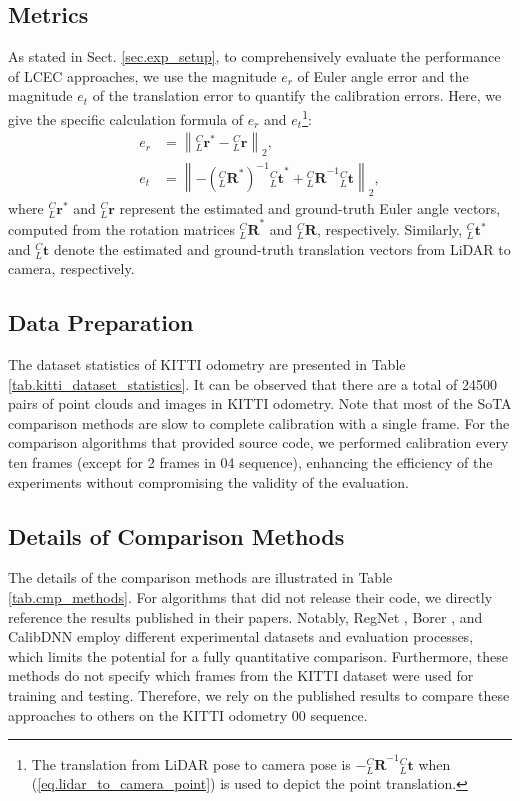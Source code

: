 \subsection{Metrics}
As stated in Sect. \ref{sec.exp_setup}, to comprehensively evaluate the performance of LCEC approaches, we use the magnitude $e_r$ of Euler angle error and the magnitude $e_t$ of the translation error to quantify the calibration errors. Here, we give the specific calculation formula of $e_r$ and $e_t$\footnote{The translation from LiDAR pose to camera pose is $-{{^{C}_{L}\boldsymbol{R}}^{-1}}{{^C_L}\boldsymbol{t}}$ when (\ref{eq.lidar_to_camera_point}) is used to depict the point translation.}:
\begin{equation}
\begin{aligned}
e_r &=  \left\|{{^C_L}\boldsymbol{r}^*} - {{^C_L}\boldsymbol{r}}\right\|_2, \\
e_t &= \left\|-{({^{C}_{L}\boldsymbol{R}^*})^{-1}}{{^C_L}\boldsymbol{t}}^* +{{^{C}_{L}\boldsymbol{R}}^{-1}}{{^C_L}\boldsymbol{t}}\right\|_2,
\end{aligned}
\label{exp_metrics}
\end{equation}
where ${{^C_L}\boldsymbol{r}^{*}}$ and ${{^C_L}\boldsymbol{r}}$ represent the estimated and ground-truth Euler angle vectors, computed from the rotation matrices ${^{C}_{L}\boldsymbol{R}}^*$ and ${^{C}_{L}\boldsymbol{R}}$, respectively. Similarly, ${^C_L}\boldsymbol{t}^*$ and ${^C_L}\boldsymbol{t}$ denote the estimated and ground-truth translation vectors from LiDAR to camera, respectively.



\subsection{Data Preparation}
The dataset statistics of KITTI odometry are presented in Table \ref{tab.kitti_dataset_statistics}. It can be observed that there are a total of 24500 pairs of point clouds and images in KITTI odometry. Note that most of the SoTA comparison methods are slow to complete calibration with a single frame. For the comparison algorithms that provided source code, we performed calibration every ten frames (except for 2 frames in 04 sequence), enhancing the efficiency of the experiments without compromising the validity of the evaluation. 

\subsection{Details of Comparison Methods}
The details of the comparison methods are illustrated in Table \ref{tab.cmp_methods}. For algorithms that did not release their code, we directly reference the results published in their papers. Notably, RegNet \cite{schneider2017regnet}, Borer \etal \cite{borer2024chaos}, and CalibDNN \cite{zhao2021calibdnn} employ different experimental datasets and evaluation processes, which limits the potential for a fully quantitative comparison. Furthermore, these methods do not specify which frames from the KITTI dataset were used for training and testing. Therefore, we rely on the published results to compare these approaches to others on the KITTI odometry 00 sequence.

